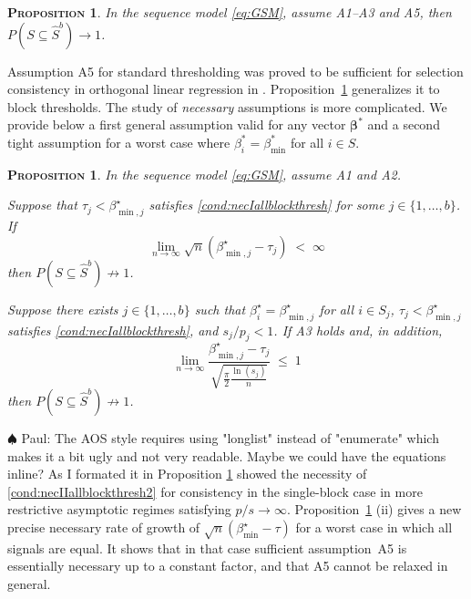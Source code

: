 \documentclass[aos]{imsart}
\theoremstyle{plain}
\newtheorem{prop}[thm]{\textsc{Proposition}}
\newcommand{\paul}[1]{{\small{\color{green} \sf $\spadesuit$ Paul: #1}}}
\newcommand{\bs}{\boldsymbol}
\begin{document}
\begin{prop}\label{prop:suffnecIIblockthresh}
 In the sequence model \eqref{eq:GSM}, assume A1--A3 and A5, then
$P(S\subseteq \hat{S}^{b} ) \to 1$.
\end{prop}
Assumption A5 for standard thresholding was proved to be sufficient for selection consistency in orthogonal linear regression in \cite{wainwrighthighdimbook}. Proposition~\ref{prop:suffnecIIblockthresh} generalizes it to block thresholds. The study of {\it necessary} assumptions
is more complicated. We provide below a first general assumption valid for any vector $\bs \beta^*$ and a second tight assumption for a worst case where $\beta_i^*=\beta_{\min}^*$ for all $i\in S$.
\begin{prop}\label{prop:necIIblockthresh}In the
sequence model \eqref{eq:GSM}, assume A1 and A2.
\begin{longlist}
    \item Suppose that $\tau_j<\beta^\star_{\min,j}$ satisfies \eqref{cond:necIallblockthresh} for some $j \in \{1,\ldots,b\}$. If \begin{equation}\label{cond:necIIallblockthresh2}
    \lim_{n\to \infty} \sqrt{n}(\beta_{\min,j}^{\star}-\tau_j)\; <\; \infty
\end{equation}
then $P(S\subseteq \hat{S}^{b} ) \not \to 1$.
\item Suppose there exists $j\in \{1,\ldots,b\}$ such that  $\beta^{\star}_i=\beta_{\min,j}^{\star}$ for all $i \in S_j$, $\tau_j<\beta^\star_{\min,j}$ satisfies \eqref{cond:necIallblockthresh}, and  $s_j/p_j<1$. If A3 holds and, in addition, 
\begin{equation}\label{cond:necIIallblockthresh}
\lim_{n\to \infty} 	\frac{\beta_{\min,j}^{\star}-\tau_j}{\sqrt{\frac{\pi}{2}\frac{\ln(s_j)}{n}}} \;\leq\;  1\end{equation}
then $P(S\subseteq \hat{S}^{b} ) \not \to 1$.
\end{longlist}\end{prop}
\paul{The AOS style requires using "longlist" instead of "enumerate" which makes it a bit ugly and not very readable. Maybe we could have the equations inline? As I formated it in Proposition \ref{prop:suffnecIIblockthresh}}
\cite{abraham2023sharp} showed the necessity of \eqref{cond:necIIallblockthresh2} for consistency in the single-block case
in more restrictive asymptotic regimes satisfying $p/s \to \infty$.
Proposition~\ref{prop:necIIblockthresh} (ii) gives a new precise necessary  rate of growth of $\sqrt{n}\left(\beta_{\min}^{\star}-\tau\right)$ for a worst case in which all signals are equal. It shows that in that case sufficient assumption~A5 is essentially necessary up to a constant factor, and that A5 cannot be relaxed in general.
\bigskip
\end{document}
